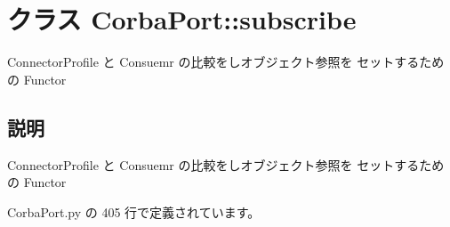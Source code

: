 \section{クラス CorbaPort::subscribe}
\label{classsource__py_1_1_corba_port_1_1_corba_port_1_1subscribe}
ConnectorProfile と Consuemr の比較をしオブジェクト参照を セットするための Functor  




\subsection{説明}
ConnectorProfile と Consuemr の比較をしオブジェクト参照を セットするための Functor 

 CorbaPort.py の 405 行で定義されています。